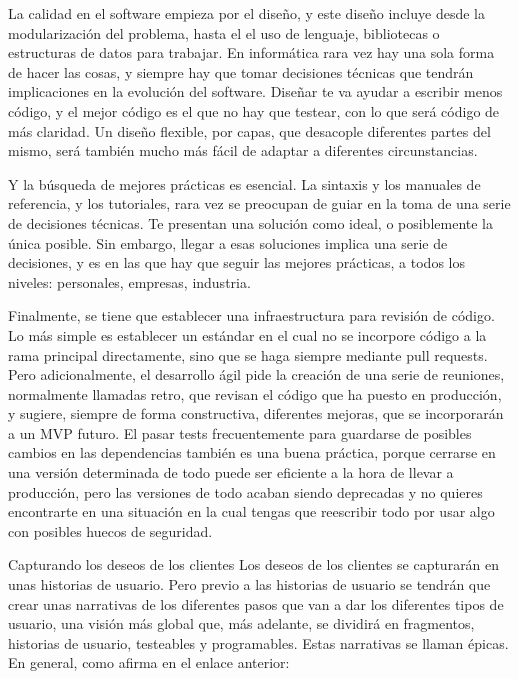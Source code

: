 \begin{itemize}
La calidad en el software empieza por el diseño, y este 
diseño incluye desde la modularización del problema, 
hasta el el uso de lenguaje, bibliotecas o estructuras 
de datos para trabajar. En informática rara vez hay 
una sola forma de hacer las cosas, y siempre hay que 
tomar decisiones técnicas que tendrán implicaciones 
en la evolución del software. Diseñar te va ayudar 
a escribir menos código, y el mejor código es el 
que no hay que testear, con lo que será código de 
más claridad. Un diseño flexible, por capas, que 
desacople diferentes partes del mismo, será también 
mucho más fácil de adaptar a diferentes circunstancias.

Y la búsqueda de mejores prácticas es esencial. La 
sintaxis y los manuales de referencia, y los tutoriales, 
rara vez se preocupan de guiar en la toma de una serie 
de decisiones técnicas. Te presentan una solución como 
ideal, o posiblemente la única posible. Sin embargo, 
llegar a esas soluciones implica una serie de decisiones, 
y es en las que hay que seguir las mejores prácticas, 
a todos los niveles: personales, empresas, industria.

Finalmente, se tiene que establecer una infraestructura 
para revisión de código. Lo más simple es establecer 
un estándar en el cual no se incorpore código a la 
rama principal directamente, sino que se haga 
siempre mediante pull requests. Pero adicionalmente, 
el desarrollo ágil pide la creación de una serie de 
reuniones, normalmente llamadas retro, que revisan 
el código que ha puesto en producción, y sugiere, 
siempre de forma constructiva, diferentes mejoras, que 
se incorporarán a un MVP futuro. El pasar tests 
frecuentemente para guardarse de posibles cambios 
en las dependencias también es una buena práctica, 
porque cerrarse en una versión determinada de todo 
puede ser eficiente a la hora de llevar a producción, 
pero las versiones de todo acaban siendo deprecadas y
no quieres encontrarte en una situación en la cual 
tengas que reescribir todo por usar algo con posibles huecos de seguridad.

\end{itemize}
Capturando los deseos de los clientes
Los deseos de los clientes se capturarán en unas historias de usuario. 
Pero previo a las historias de usuario se tendrán que crear unas 
narrativas de los diferentes pasos que van a dar los diferentes 
tipos de usuario, una visión más global que, más adelante, se 
dividirá en fragmentos, historias de usuario, testeables y 
programables. Estas narrativas se llaman épicas. En general, 
como afirma en el enlace anterior:

